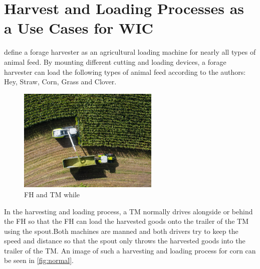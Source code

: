 \documentclass[]{nsm-thesis}
\begin{document}

\section{Harvest and Loading Processes as a Use Cases for \ac{WIC}}

\textcite{seifert_feldhacksler_1962} define a forage harvester as an agricultural loading machine for nearly all types of animal feed. By mounting different cutting and loading devices, a forage harvester can load the following types of animal feed according to the authors: Hey, Straw, Corn, Grass and Clover.

\begin{figure}%
	\centering
	\includegraphics[width=0.6\textwidth]{figures/claas_harvest_side.png}
	\caption{\ac{FH} and \ac{TM} while }%
	\label{fig:normal}%
\end{figure}

In the harvesting and loading process, a \ac{TM} normally drives alongside or behind the \ac{FH} so that the \ac{FH} can load the harvested goods onto the trailer of the \ac{TM} using the spout.Both machines are manned and both drivers try to keep the speed and distance so that the spout only throws the harvested goods into the trailer of the TM. An image of such a harvesting and loading process for corn can be seen in \autoref{fig:normal}.
\end{document}
